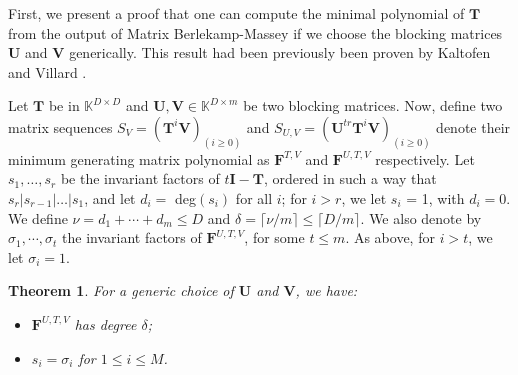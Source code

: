 \documentclass[12pt]{article}
\newtheorem{theorem}[definition]{Theorem}
\def\mF{\mathbf{F}}
\def\mI{\mathbf{I}}
\def\mT{\mathbf{T}}
\def\mU{\mathbf{U}}
\def\mV{\mathbf{V}}
\begin{document}
First, we present a proof that one can compute
the minimal polynomial of $\mT$ from the
output of Matrix Berlekamp-Massey if we choose
the blocking matrices $\mU$ and $\mV$ generically.
This result had been previously been proven by
Kaltofen and Villard \cite{KaVi04}\cite{Villard97a}.

Let $\mT$ be in $\mathbb{K}^{D \times D}$ and 
$\mU,\mV \in \mathbb{K}^{D \times m}$ be two blocking matrices. Now, define two matrix sequences
$S_V = (\mT^i \mV)_{(i \ge 0)}$ and 
$S_{U,V} = (\mU^{tr} \mT^i \mV)_{(i \ge 0)}$ denote their minimum
generating matrix polynomial as $\mF^{T,V}$ and $\mF^{U,T,V}$ respectively.
Let $s_1, \dots, s_r$ be the invariant factors
of $t\mI - \mT$, ordered in such a way that 
$s_r | s_{r-1}| \dots | s_1$, and let $d_i = $ deg$(s_i)$ for
all $i$; for $i > r$, we let $s_i$ = 1, with $d_i = 0$.
We define $\nu = d_1 + \cdots + d_m \le D$ and
$\delta = \lceil \nu / m \rceil \le \lceil D / m \rceil$.
We also denote by $\sigma_1, \cdots, \sigma_t$ the invariant
factors of $\mF^{U,T,V}$, for some $t \le m$. As above,
for $i > t$, we let $\sigma_i = 1$.

\begin{theorem}
	\label{randXY}
	For a generic choice of $\mU$ and $\mV$, we have:
	\begin{itemize}
		\item $\mF^{U,T,V}$ has degree $\delta$;
		\item $s_i = \sigma_i$ for $1 \le i \le M$.
	\end{itemize}
\end{theorem}
\end{document}
